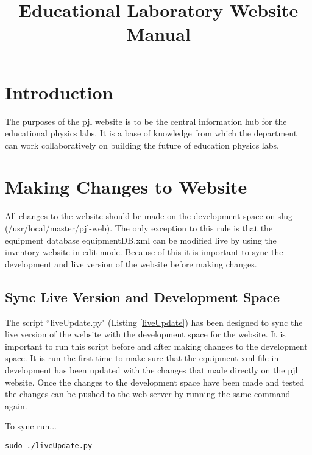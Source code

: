 \documentclass[justified]{book}
\begin{document}
\title{Educational Laboratory Website Manual}
\maketitle
\tableofcontents

\section{Introduction}

The purposes of the pjl website is to be the central information hub for the educational physics labs. It is a base of knowledge from which the department can work collaboratively on building the future of education physics labs.

\newpage

\section{Making Changes to Website}

All changes to the website should be made on the development space on slug (/usr/local/master/pjl-web). The only exception to this rule is that the equipment database equipmentDB.xml can be modified live by using the inventory website in edit mode. Because of this it is important to sync the development and live version of the website before making changes.

\subsection{Sync Live Version and Development Space}

The script ``liveUpdate.py" (Listing \ref{liveUpdate}) has been designed to sync the live version of the website with the development space for the website. It is important to run this script before and after making changes to the development space. It is run the first time to make sure that the equipment xml file in development has been updated with the changes that made directly on the pjl website. Once the changes to the development space have been made and tested the changes can be pushed to the web-server by running the same command again.

\vspace{12pt}
\noindent To sync run...
\begin{lstlisting}[backgroundcolor = \color{light-gray}]
sudo ./liveUpdate.py
\end{lstlisting}
\end{document}
